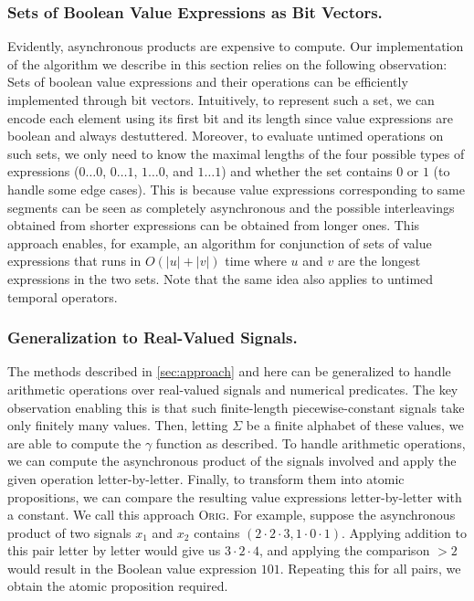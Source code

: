 \subsubsection{Sets of Boolean Value Expressions as Bit Vectors.}
Evidently, asynchronous products are expensive to compute.
Our implementation of the algorithm we describe in this section relies on the following observation:
Sets of boolean value expressions and their operations can be efficiently implemented through bit vectors.
Intuitively, to represent such a set, we can encode each element using its first bit and its length since value expressions are boolean and always destuttered.
Moreover, to evaluate untimed operations on such sets, we only need to know the maximal lengths of the four possible types of expressions ($0 \ldots 0$, $0 \ldots 1$, $1 \ldots 0$, and $1 \ldots 1$) and whether the set contains $0$ or $1$ (to handle some edge cases).
This is because value expressions corresponding to same segments can be seen as completely asynchronous and the possible interleavings obtained from shorter expressions can be obtained from longer ones.
This approach enables, for example, an algorithm for conjunction of sets of value expressions that runs in $O(|u| + |v|)$ time where $u$ and $v$ are the longest expressions in the two sets.
Note that the same idea also applies to untimed temporal operators.


\subsubsection{Generalization to Real-Valued Signals.}
The methods described in \cref{sec:approach} and here can be generalized to handle arithmetic operations over real-valued signals and numerical predicates.
The key observation enabling this is that such finite-length piecewise-constant signals take only finitely many values.
Then, letting $\Sigma$ be a finite alphabet of these values, we are able to compute the $\gamma$ function as described.
To handle arithmetic operations, we can compute the asynchronous product of the signals involved and apply the given operation letter-by-letter.
Finally, to transform them into atomic propositions, we can compare the resulting value expressions letter-by-letter with a constant.
We call this approach \textsc{Orig}.
For example, suppose the asynchronous product of two signals $x_1$ and $x_2$ contains $(2\cdot2\cdot3, 1\cdot0\cdot1)$.
Applying addition to this pair letter by letter would give us $3 \cdot 2 \cdot 4$, and applying the comparison $> 2$ would result in the Boolean value expression $101$.
Repeating this for all pairs, we obtain the atomic proposition required.

